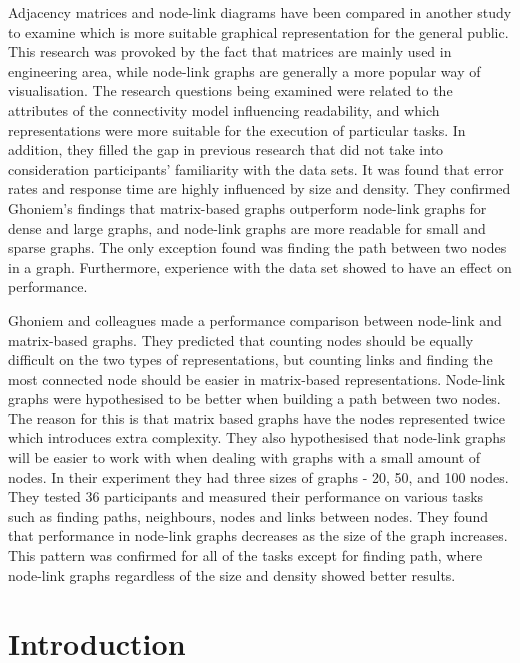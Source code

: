 \documentclass{l4proj}
\begin{document}
Adjacency matrices and node-link diagrams have been compared in another study \cite{keller2006matrices} to examine which is more suitable graphical representation for the general public. This research was provoked by the fact that matrices are mainly used in engineering area, while node-link graphs are generally a more popular way of visualisation. The research questions being examined were related to the attributes of the connectivity model influencing readability, and which representations were more suitable for the execution of particular tasks. In addition, they filled the gap in previous research that did not take into consideration participants' familiarity with the data sets. It was found that error rates and response time are highly influenced by size and density. They confirmed Ghoniem's \cite{ghoniem2004comparison} findings that matrix-based graphs outperform node-link graphs for dense and large graphs, and node-link graphs are more readable for small and sparse graphs. The only exception found was finding the path between two nodes in a graph. Furthermore, experience with the data set showed to have an effect on performance. 

Ghoniem and colleagues \cite{ghoniem2004comparison} made a performance comparison between node-link and matrix-based graphs. They predicted that counting nodes should be equally difficult on the two types of representations, but counting links and finding the most connected node should be easier in matrix-based representations. Node-link graphs were hypothesised to be better when building a path between two nodes. The reason for this is that matrix based graphs have the nodes represented twice which introduces extra complexity. They also hypothesised that node-link graphs will be easier to work with when dealing with graphs with a small amount of nodes. In their experiment they had three sizes of graphs - 20, 50, and 100 nodes. They tested 36 participants and measured their performance on various tasks such as finding paths, neighbours, nodes and links between nodes. They found that performance in node-link graphs decreases as the size of the graph increases. This pattern was confirmed for all of the tasks except for finding path, where node-link graphs regardless of the size and density showed better results.

\chapter{Introduction}
\end{document}

